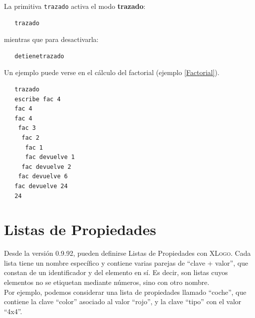 La primitiva \texttt{trazado}  activa el modo
\textbf{trazado}:
\begin{verbatim}
   trazado\end{verbatim}
mientras que para desactivarla:
\begin{verbatim}
   detienetrazado \end{verbatim}
Un ejemplo puede verse en el c\'alculo del factorial 
(ejemplo \ref{Factorial}).
\begin{verbatim}
   trazado
   escribe fac 4
   fac 4
   fac 4
    fac 3
     fac 2
      fac 1
      fac devuelve 1
     fac devuelve 2
    fac devuelve 6
   fac devuelve 24
   24 \end{verbatim}

\section{Listas de Propiedades}
   \label{ListaPropiedades}

Desde la versi\'on 0.9.92, pueden definirse Listas de Propiedades con
\textsc{XLogo}. Cada lista tiene un nombre espec\'ifico y contiene varias parejas
de ``clave + valor'', que constan de un identificador y del elemento en s\'i.
Es decir, son listas cuyos elementos no se etiquetan mediante n\'umeros, sino
con otro nombre.\\

\noindent Por ejemplo, podemos considerar una lista de propiedades llamado 
``coche'', que contiene la clave ``color'' asociado al valor ``rojo'',
y la clave ``tipo'' con el valor ``4x4''. \\

